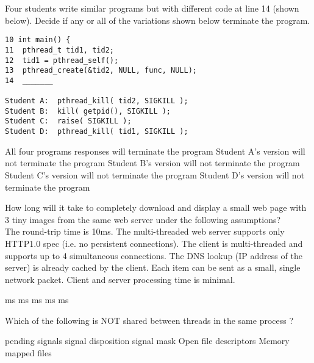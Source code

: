 \variant
Four students write similar programs but with different code at line 14 (shown below). Decide if any or all of the variations shown below terminate the program.
\begin{verbatim}
10 int main() {
11  pthread_t tid1, tid2;
12  tid1 = pthread_self();
13  pthread_create(&tid2, NULL, func, NULL);
14  _______
      
Student A:  pthread_kill( tid2, SIGKILL );
Student B:  kill( getpid(), SIGKILL );
Student C:  raise( SIGKILL );
Student D:  pthread_kill( tid1, SIGKILL );

\end{verbatim}
\begin{answers}
\correctanswer All four programs responses will terminate the program
\answer Student A's version will not terminate the program
\answer Student B's version will not terminate the program
\answer Student C's version will not terminate the program
\answer Student D's version will not terminate the program
\end{answers}
\begin{solution}
\end{solution}

\variant
How long will it take to completely download and display a small web page with 3 tiny images from the same web server under the following assumptions?\\
The round-trip time is 10ms. The multi-threaded web server supports only HTTP1.0 spec (i.e. no persistent connections). The client is multi-threaded and supports up to 4 simultaneous connections. The DNS lookup (IP address of the server) is already cached by the client. Each item can be sent as a small, single network packet. Client and server processing time is minimal.
\begin{answers}
 ms
 ms
 ms
 ms
 ms
\end{answers}
\begin{solution}
\end{solution}

\variant
Which of the following is NOT shared between threads in the same process ?
\begin{answers}
\answer pending signals
\answer signal disposition
\correctanswer signal mask
\answer Open file descriptors 
\answer Memory mapped files
\end{answers}
\begin{solution}
\end{solution}

